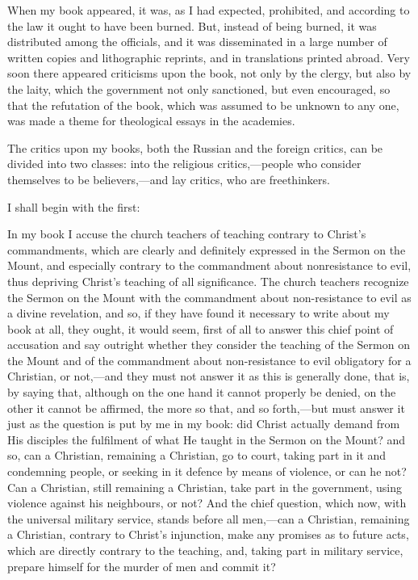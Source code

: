 \documentclass{book}
\begin{document}
When my book appeared, it was, as I had expected, prohibited, and according to the law it ought to have been burned. But, instead of being burned, it was distributed among the officials, and it was disseminated in a large number of written copies and lithographic reprints, and in translations printed abroad. Very soon there appeared criticisms upon the book, not only by the clergy, but also by the laity, which the government not only sanctioned, but even encouraged, so that the refutation of the book, which was assumed to be unknown to any one, was made a theme for theological essays in the academies.

The critics upon my books, both the Russian and the foreign critics, can be divided into two classes: into the religious critics,—people who consider themselves to be believers,—and lay critics, who are freethinkers.

I shall begin with the first:

In my book I accuse the church teachers of teaching contrary to Christ’s commandments, which are clearly and definitely expressed in the Sermon on the Mount, and especially contrary to the commandment about nonresistance to evil, thus depriving Christ’s teaching of all significance. The church teachers recognize the Sermon on the Mount with the commandment about non-resistance to evil as a divine revelation, and so, if they have found it necessary to write about my book at all, they ought, it would seem, first of all to answer this chief point of accusation and say outright whether they consider the teaching of the Sermon on the Mount and of the commandment about non-resistance to evil obligatory for a Christian, or not,—and they must not answer it as this is generally done, that is, by saying that, although on the one hand it cannot properly be denied, on the other it cannot be affirmed, the more so that, and so forth,—but must answer it just as the question is put by me in my book: did Christ actually demand from His disciples the fulfilment of what He taught in the Sermon on the Mount? and so, can a Christian, remaining a Christian, go to court, taking part in it and condemning people, or seeking in it defence by means of violence, or can he not? Can a Christian, still remaining a Christian, take part in the government, using violence against his neighbours, or not? And the chief question, which now, with the universal military service, stands before all men,—can a Christian, remaining a Christian, contrary to Christ’s injunction, make any promises as to future acts, which are directly contrary to the teaching, and, taking part in military service, prepare himself for the murder of men and commit it?
\end{document}
